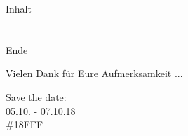 \documentclass[12pt,hyperref={pdfpagelabels=false},notes=show,aspectratio=169]{beamer}
\begin{document}

\begin{frame}{Inhalt}
    \hspace{0.1\textwidth}
    \parbox[c][0.8\textheight][s]{0.8\textwidth}{
        \tableofcontents
    }
\end{frame}








\section*{}
\begin{frame}{Ende}
    \begin{center}
        Vielen Dank für Eure Aufmerksamkeit	...

        \vfill

        Save the date:\\
        05.10. - 07.10.18\\
        \#18FFF
     \end{center}
\end{frame}\addtocounter{framenumber}{-1}
	
\end{document}

